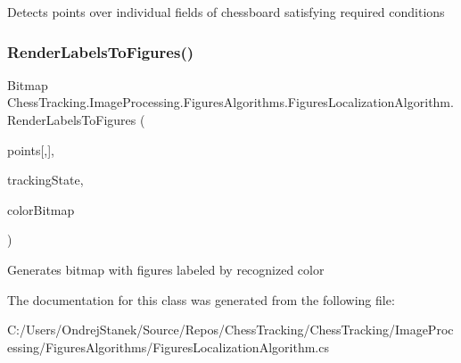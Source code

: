 Detects points over individual fields of chessboard satisfying required conditions 

\mbox{\label{class_chess_tracking_1_1_image_processing_1_1_figures_algorithms_1_1_figures_localization_algorithm_ada26faa67eef9d5375afdece54b09688}} 
\subsubsection{\texorpdfstring{RenderLabelsToFigures()}{RenderLabelsToFigures()}}
{\footnotesize\ttfamily Bitmap Chess\+Tracking.\+Image\+Processing.\+Figures\+Algorithms.\+Figures\+Localization\+Algorithm.\+Render\+Labels\+To\+Figures (\begin{DoxyParamCaption}\item[{List$<$ \mbox{\hyperlink{struct_chess_tracking_1_1_image_processing_1_1_pipeline_data_1_1_point2_d_with_color}{Point2\+D\+With\+Color}} $>$}]{points\mbox{[},\mbox{]},  }\item[{\mbox{\hyperlink{class_chess_tracking_1_1_multithreading_messages_1_1_tracking_state}{Tracking\+State}}}]{tracking\+State,  }\item[{Bitmap}]{color\+Bitmap }\end{DoxyParamCaption})\hspace{0.3cm}{\ttfamily [private]}}



Generates bitmap with figures labeled by recognized color 



The documentation for this class was generated from the following file\+:\begin{DoxyCompactItemize}
\item 
C\+:/\+Users/\+Ondrej\+Stanek/\+Source/\+Repos/\+Chess\+Tracking/\+Chess\+Tracking/\+Image\+Processing/\+Figures\+Algorithms/Figures\+Localization\+Algorithm.\+cs\end{DoxyCompactItemize}
